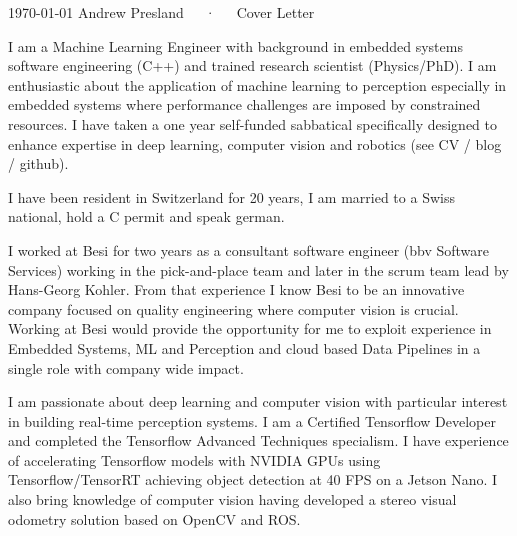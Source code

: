 \documentclass[11pt, a4paper]{awesome-cv}
\begin{document}
\makecvheader[R]

\makecvfooter
  {\today}
  {Andrew Presland~~~·~~~Cover Letter}
  {}

\makelettertitle

\begin{cvletter}

I am a Machine Learning Engineer with background in embedded systems software 
engineering (C++) and trained research scientist (Physics/PhD).
I am enthusiastic about the application of machine learning to perception especially 
in embedded systems where performance challenges are imposed by constrained resources. 
I have taken a one year self-funded sabbatical specifically designed to enhance 
expertise in deep learning, computer vision and robotics (see CV / blog / github). 

I have been resident in Switzerland for 20 years, I am married to a Swiss
national, hold a C permit and speak german.

I worked at Besi for two years as a consultant software engineer (bbv Software Services) 
working in the pick-and-place team and later in the scrum team lead by 
Hans-Georg Kohler. From that experience I know Besi to be an innovative company 
focused on quality engineering where computer vision is crucial. Working at Besi 
would provide the opportunity for me to exploit experience in Embedded Systems, ML and Perception 
and cloud based Data Pipelines in a single role with company wide impact.



I am passionate about deep learning and computer vision with particular interest
in building real-time perception systems. I am a Certified Tensorflow 
Developer and completed the Tensorflow Advanced Techniques specialism. 
I have experience of accelerating Tensorflow models with NVIDIA GPUs using 
Tensorflow/TensorRT achieving object detection at 40 FPS on a Jetson Nano. I also 
bring knowledge of computer vision having developed a stereo visual odometry solution 
based on OpenCV and ROS.  


\end{cvletter}
\end{document}

